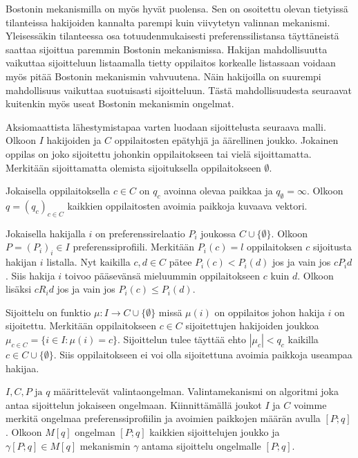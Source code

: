 \documentclass{tktltiki}
\begin{document}
Bostonin mekanismilla on myös hyvät puolensa. Sen on osoitettu olevan
tietyissä tilanteissa hakijoiden kannalta parempi kuin viivytetyn
valinnan mekanismi. Yleisessäkin tilanteessa osa totuudenmukaisesti
preferenssilistansa täyttäneistä saattaa sijoittua paremmin Bostonin
mekanismissa. Hakijan mahdollisuutta vaikuttaa sijoitteluun
listaamalla tietty oppilaitos korkealle listassaan voidaan myös pitää
Bostonin mekanismin vahvuutena. Näin hakijoilla on suurempi
mahdollisuus vaikuttaa suotuisasti sijoitteluun. Tästä
mahdollisuudesta seuraavat kuitenkin myös useat Bostonin mekanismin
ongelmat.

Aksiomaattista lähestymistapaa varten luodaan sijoittelusta seuraava
malli. Olkoon \(I\) hakijoiden ja \(C\) oppilaitosten epätyhjä ja
äärellinen joukko. Jokainen oppilas on joko sijoitettu johonkin
oppilaitokseen tai vielä sijoittamatta. Merkitään sijoittamatta
olemista sijoituksella oppilaitokseen \(\emptyset\).

Jokaisella oppilaitoksella \(c \in C\) on \(q_c\) avoinna olevaa
paikkaa ja \(q_{\emptyset} = \infty\). Olkoon \(q = (q_c)_{c \in C}\)
kaikkien oppilaitosten avoimia paikkoja kuvaava vektori.

Jokaisella hakijalla \(i\) on preferenssirelaatio \(P_i\) joukossa \(C
\cup \{\emptyset\}\). Olkoon \(P = (P_i)_i \in I\)
preferenssiprofiili. Merkitään \(P_i(c) = l\) oppilaitoksen \(c\)
sijoitusta hakijan \(i\) listalla. Nyt kaikilla \(c, d \in C\) pätee
\(P_i(c) < P_i(d)\) jos ja vain jos \(cP_id\). Siis hakija \(i\)
toivoo pääsevänsä mieluummin oppilaitokseen \(c\) kuin \(d\). Olkoon
lisäksi \(cR_id\) jos ja vain jos \(P_i(c) \leq P_i(d)\).

Sijoittelu on funktio \(\mu : I \rightarrow C \cup \{\emptyset\}\)
missä \(\mu(i)\) on oppilaitos johon hakija \(i\) on sijoitettu.
Merkitään oppilaitokseen \(c \in C\) sijoitettujen hakijoiden joukkoa
\(\mu_{c \in C} = \{i \in I : \mu(i) = c\}\). Sijoittelun tulee
täyttää ehto \(|\mu_c| < q_c\) kaikilla \(c \in C \cup
\{\emptyset\}\). Siis oppilaitokseen ei voi olla sijoitettuna avoimia
paikkoja useampaa hakijaa.

\(I, C, P \text{ ja } q\) määrittelevät valintaongelman.
Valintamekanismi on algoritmi joka antaa sijoittelun jokaiseen
ongelmaan. Kiinnittämällä joukot \(I\) ja \(C\) voimme merkitä
ongelmaa preferenssiprofiilin ja avoimien paikkojen määrän avulla
\([P;q]\). Olkoon \(M[q]\) ongelman \([P;q]\) kaikkien sijoittelujen
joukko ja \(\gamma [P;q] \in M[q]\) mekanismin \(\gamma\) antama
sijoittelu ongelmalle \([P;q]\).
\end{document}
